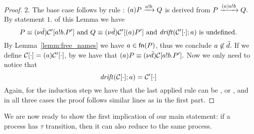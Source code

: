 \begin{proof}
$\mathit{2.}$ %
The base case follows by rule : 
$(a)P\xrightarrow{a!b}Q$ is derived from $P\xrightarrow{{(a)}a!b}Q.$ 
By statement $1$. of this Lemma we have
\[
P\equiv(\nu \tilde {d})\mathcal{C}'[a!b.P'] \text{ and } Q\equiv(\nu \tilde {d})\mathcal{C}'[(a)P'] \text{ and } \mathit {drift}(\mathcal{C}'[\cdot]; a) \text{ is undefined.}
\]  
By Lemma~\ref{lemm:free_names} we have $a\in \mathsf{fn}(P)$, thus we conclude $a\not\in\tilde {d}.$ 
If we define $\mathcal{C}[\cdot]=(a)\mathcal{C}'[\cdot]$, by  we have that $(a)P\equiv(\nu \tilde {d})\mathcal{C}[a!b.P'].$ 
Now we only need to notice that
\[
\mathit {drift}(\mathcal{C}[\cdot]; a)=\mathcal{C}'[\cdot]
\] 
Again, for the induction step we have that the last applied rule can be ,  or , and in all three cases the proof follows similar lines as in the first part.
\end{proof}

We are now ready to show the first implication of our main statement: if a process has $\tau$ transition, then it can also reduce to the same process.

